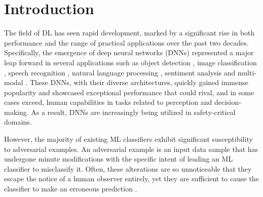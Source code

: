 \documentclass[sn-mathphys]{sn-jnl}%
\theoremstyle{thmstyleone}%
\theoremstyle{thmstyletwo}%
\theoremstyle{thmstylethree}%
\begin{document}
\section{Introduction}\label{Introduction}
The field of DL has seen rapid development, marked by a significant rise in both performance and the range of practical applications over the past two decades. Specifically, the emergence of deep neural networks (DNNs) represented a major leap forward in several applications such as object detection \cite{girshick2015fast}, image classification \cite{krizhevsky2012imagenet}, speech recognition \cite{amodei2016deep}, natural language processing \cite{deng2018deep}, sentiment analysis \cite{ortis2019overview} and multi-modal \cite{carrara2018picture}. These DNNs, with their diverse architectures, quickly gained immense popularity and showcased exceptional performance that could rival, and in some cases exceed, human capabilities in tasks related to perception and decision-making. As a result, DNNs are increasingly being utilized in safety-critical domains. %

However, the majority of existing ML classifiers exhibit significant susceptibility to adversarial examples. An adversarial example is an input data sample that has undergone minute modifications with the specific intent of leading an ML classifier to misclassify it. Often, these alterations are so unnoticeable that they escape the notice of a human observer entirely, yet they are sufficient to cause the classifier to make an erroneous prediction %
\cite{szegedy2013intriguing, goodfellow2014explaining}. %
\end{document}
